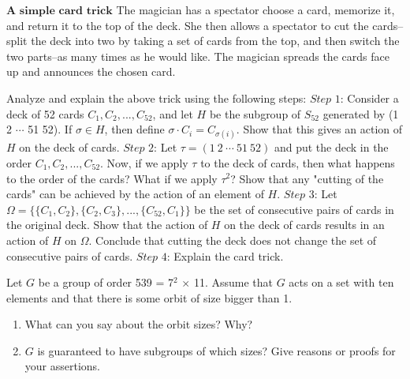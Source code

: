 \documentclass[12pt,letterpaper,boxed]{hmcpset}
\begin{document}

\begin{problem}[4.5.1]
$ \textbf{A simple card trick} $ \newline 
\hangindent=1cm
The magician has a spectator choose a card, memorize it, and return it to the top of the deck. She then allows a spectator to cut the cards--split the deck into two by taking a set of cards from the top, and then switch the two parts--as many times as he would like. The magician spreads the cards face up and announces the chosen card. \newline

Analyze and explain the above trick using the following steps: \newline
$\textit{Step 1}$: Consider a deck of 52 cards $C_1,C_2,...,C_{52}$, and let $H$ be the subgroup of $S_{52}$ generated by (1 2 $\cdots$ 51 52). If $ \sigma \in H $, then define $ \sigma \cdot C_i = C_{\sigma(i)} $. Show that this gives an action of $H$ on the deck of cards. \newline
$\textit{Step 2}$: Let $ \tau = ( 1 \ 2 \ \cdots \ 51 \ 52 ) $ and put the deck in the order $ C_1,C_2,...,C_{52} $. Now, if we apply $\tau$ to the deck of cards, then what happens to the order of the cards? What if we apply $\tau^2$? Show that any "cutting of the cards" can be achieved by the action of an element of $H$. \newline
$\textit{Step 3}$: Let $\Omega = \{ \{ C_1,C_2 \}, \{ C_2,C_3 \},..., \{ C_{52}, C_1 \} \} $ be the set of consecutive pairs of cards in the original deck. Show that the action of $H$ on the deck of cards results in an action of $H$ on $\Omega$. Conclude that cutting the deck does not change the set of consecutive pairs of cards. \newline
$\textit{Step 4}$: Explain the card trick.
\end{problem}

\begin{solution}

\end{solution}

\clearpage

\begin{problem}[7.2.6]
Let $G$ be a group of order 539 = 7$^2$ $\times$ 11. Assume that $G$ acts on a set with ten elements and that there is some orbit of size bigger than 1. 
\begin{enumerate}[label=\alph*]
\item What can you say about the orbit sizes? Why?
\item $G$ is guaranteed to have subgroups of which sizes? Give reasons or proofs for your assertions.
\end{enumerate}

\end{problem}
\end{document}
